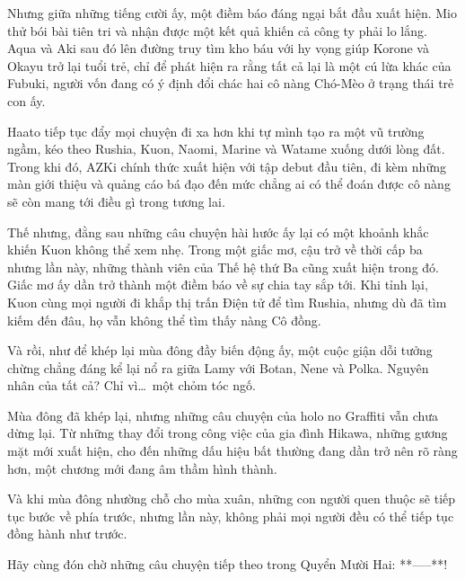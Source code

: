 \documentclass[main.tex]{subfiles}
\begin{document}
Nhưng giữa những tiếng cười ấy, một điềm báo đáng ngại bắt đầu xuất hiện. Mio thử bói bài tiên tri và nhận được một kết quả khiến cả công ty phải lo lắng. Aqua và Aki sau đó lên đường truy tìm kho báu với hy vọng giúp Korone và Okayu trở lại tuổi trẻ, chỉ để phát hiện ra rằng tất cả lại là một cú lừa khác của Fubuki, người vốn đang có ý định đổi chác hai cô nàng Chó-Mèo ở trạng thái trẻ con ấy.

Haato tiếp tục đẩy mọi chuyện đi xa hơn khi tự mình tạo ra một vũ trường ngầm, kéo theo Rushia, Kuon, Naomi, Marine và Watame xuống dưới lòng đất. Trong khi đó, AZKi chính thức xuất hiện với tập debut đầu tiên, đi kèm những màn giới thiệu và quảng cáo bá đạo đến mức chẳng ai có thể đoán được cô nàng sẽ còn mang tới điều gì trong tương lai.

Thế nhưng, đằng sau những câu chuyện hài hước ấy lại có một khoảnh khắc khiến Kuon không thể xem nhẹ. Trong một giấc mơ, cậu trở về thời cấp ba nhưng lần này, những thành viên của Thế hệ thứ Ba cũng xuất hiện trong đó. Giấc mơ ấy dần trở thành một điềm báo về sự chia tay sắp tới. Khi tỉnh lại, Kuon cùng mọi người đi khắp thị trấn Điện tử để tìm Rushia, nhưng dù đã tìm kiếm đến đâu, họ vẫn không thể tìm thấy nàng Cô đồng.

Và rồi, như để khép lại mùa đông đầy biến động ấy, một cuộc giận dỗi tưởng chừng chẳng đáng kể lại nổ ra giữa Lamy với Botan, Nene và Polka. Nguyên nhân của tất cả? Chỉ vì\dots\ một chỏm tóc ngố.

Mùa đông đã khép lại, nhưng những câu chuyện của holo no Graffiti vẫn chưa dừng lại. Từ những thay đổi trong công việc của gia đình Hikawa, những gương mặt mới xuất hiện, cho đến những dấu hiệu bất thường đang dần trở nên rõ ràng hơn, một chương mới đang âm thầm hình thành.

Và khi mùa đông nhường chỗ cho mùa xuân, những con người quen thuộc sẽ tiếp tục bước về phía trước, nhưng lần này, không phải mọi người đều có thể tiếp tục đồng hành như trước.

Hãy cùng đón chờ những câu chuyện tiếp theo trong Quyển Mười Hai: **-----**!
\end{document}
